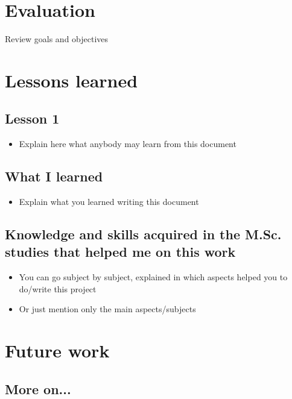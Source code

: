 \documentclass[a4paper, 12pt]{book}
\begin{document}
{\section{Evaluation}
\label{sec:evaluation}


Review goals and objectives


\section{Lessons learned}
\label{sec:lessons}

\subsection{Lesson 1}
\begin{itemize}
 \item Explain here what anybody may learn from this document
\end{itemize}

\subsection{What I learned}
\begin{itemize}
 \item Explain what you learned writing this document
\end{itemize}

\subsection{Knowledge and skills acquired in the M.Sc. studies that helped me on
this work}
\begin{itemize}
 \item You can go subject by subject, explained in which aspects helped
you to do/write this project
 \item Or just mention only the main aspects/subjects

\end{itemize}

\section{Future work}
\label{sec:future}

\subsection{More on...}

}
\end{document}
